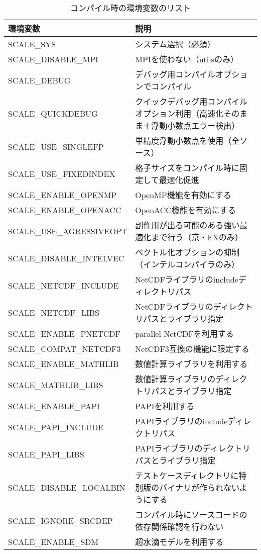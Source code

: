 \begin{table}[htb]
\begin{center}
\caption{コンパイル時の環境変数のリスト}
\begin{tabularx}{150mm}{|l|X|} \hline
 \rowcolor[gray]{0.9} 環境変数 & 説明  \\ \hline
 SCALE\_SYS               & システム選択（必須）  \\ \hline
 SCALE\_DISABLE\_MPI      & MPIを使わない（utilsのみ）  \\ \hline
 SCALE\_DEBUG             & デバッグ用コンパイルオプションでコンパイル  \\ \hline
 SCALE\_QUICKDEBUG        & クイックデバッグ用コンパイルオプション利用（高速化そのまま＋浮動小数点エラー検出）  \\ \hline
 SCALE\_USE\_SINGLEFP     & 単精度浮動小数点を使用（全ソース）  \\ \hline
 SCALE\_USE\_FIXEDINDEX   & 格子サイズをコンパイル時に固定して最適化促進  \\ \hline
 SCALE\_ENABLE\_OPENMP    & OpenMP機能を有効にする  \\ \hline
 SCALE\_ENABLE\_OPENACC   & OpenACC機能を有効にする  \\ \hline
 SCALE\_USE\_AGRESSIVEOPT & 副作用が出る可能のある強い最適化まで行う（京・FXのみ）  \\ \hline
 SCALE\_DISABLE\_INTELVEC & ベクトル化オプションの抑制（インテルコンパイラのみ）  \\ \hline
 SCALE\_NETCDF\_INCLUDE   & NetCDFライブラリのincludeディレクトリパス  \\ \hline
 SCALE\_NETCDF\_LIBS      & NetCDFライブラリのディレクトリパスとライブラリ指定  \\ \hline
 SCALE\_ENABLE\_PNETCDF   & parallel NetCDFを利用する  \\ \hline
 SCALE\_COMPAT\_NETCDF3   & NetCDF3互換の機能に限定する  \\ \hline
 SCALE\_ENABLE\_MATHLIB   & 数値計算ライブラリを利用する  \\ \hline
 SCALE\_MATHLIB\_LIBS     & 数値計算ライブラリのディレクトリパスとライブラリ指定  \\ \hline
 SCALE\_ENABLE\_PAPI      & PAPIを利用する  \\ \hline
 SCALE\_PAPI\_INCLUDE     & PAPIライブラリのincludeディレクトリパス  \\ \hline
 SCALE\_PAPI\_LIBS        & PAPIライブラリのディレクトリパスとライブラリ指定  \\ \hline
 SCALE\_DISABLE\_LOCALBIN & テストケースディレクトリに特別版のバイナリが作られないようにする  \\ \hline
 SCALE\_IGNORE\_SRCDEP    & コンパイル時にソースコードの依存関係確認を行わない  \\ \hline
 SCALE\_ENABLE\_SDM       & 超水滴モデルを利用する   \\ \hline
\end{tabularx}
\label{tab:env_var_list}
\end{center}
\end{table}

